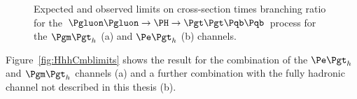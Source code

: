 \begin{figure}
\begin{center}

\end{center}
\caption{
Expected and observed limits on cross-section times branching ratio for the
$\Pgluon\Pgluon\to\PH\to\Pgt\Pgt\Pqb\Pqb$ process for the $\mutau$ (a) and
$\etau$ (b) channels.}
\label{fig:Hhhlimits}
\end{figure} 

Figure~\ref{fig:HhhCmblimits} shows the result for the combination of the
$\etau$ and $\mutau$ channels (a) and a further combination with the fully
hadronic channel not described in this thesis (b).


